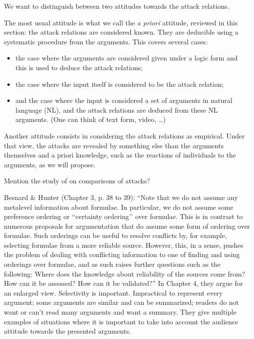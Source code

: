 \documentclass[version=3.21, pagesize, twoside=off, bibliography=totoc, DIV=calc, fontsize=12pt, a4paper, french, english]{scrartcl}
\begin{document}
We want to distinguish between two attitudes towards the attack relations. 

The most usual attitude is what we call the \emph{a priori} attitude, reviewed in this section: the attack relations are considered known. They are deducible using a systematic procedure from the arguments. This covers several cases:
\begin{itemize}
\item the case where the arguments are considered given under a logic form and this is used to deduce the attack relations;
\item the case where the input itself is considered to be the attack relation;
\item and the case where the input is considered a set of arguments in natural language (NL), and the attack relations are deduced from these NL arguments. (One can think of text form, video, …)
\end{itemize}

Another attitude consists in considering the attack relations as empirical. Under that view, the attacks are revealed by something else than the arguments themselves and a priori knowledge, such as the reactions of individuals to the arguments, as we will propose.

Mention the study of \cite{ICCS2018} on comparisons of attacks? 

Besnard \& Hunter (Chapter 3, p. 38 to 39): “Note that we do not assume any metalevel information about formulae. In particular, we do not assume some preference ordering or ‘‘certainty ordering’’ over formulae. This is in contrast to numerous proposals for argumentation that do assume some form of ordering over formulae. Such orderings can be useful to resolve conflicts by, for example, selecting formulae from a more reliable source. However, this, in a sense, pushes the problem of dealing with conflicting information to one of finding and using orderings over formulae, and as such raises further questions such as the following: Where does the knowledge about reliability of the sources come from? How can it be assessed? How can it be validated?” 
In Chapter 4, they argue for an enlarged view. Selectivity is important. Impractical to represent every argument; some arguments are similar and can be summarized; readers do not want or can’t read many arguments and want a summary. They give multiple examples of situations where it is important to take into account the audience attitude towards the presented arguments.
\end{document}
